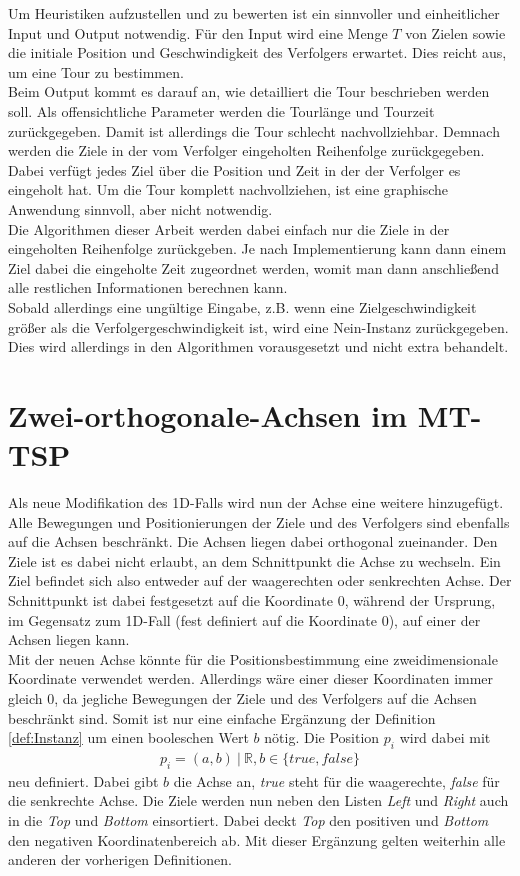 \documentclass[german,version-2019-11]{uzl-thesis}
\begin{document}
Um Heuristiken aufzustellen und zu bewerten ist ein sinnvoller und einheitlicher Input und Output notwendig. Für den Input wird eine Menge $T$ von Zielen sowie die initiale Position und Geschwindigkeit des Verfolgers erwartet. Dies reicht aus, um eine Tour zu bestimmen. \\
Beim Output kommt es darauf an, wie detailliert die Tour beschrieben werden soll. Als offensichtliche Parameter werden die Tourlänge und Tourzeit zurückgegeben. Damit ist allerdings die Tour schlecht nachvollziehbar. Demnach werden die Ziele in der vom Verfolger eingeholten Reihenfolge zurückgegeben. Dabei verfügt jedes Ziel über die Position und Zeit in der der Verfolger es eingeholt hat. Um die Tour komplett nachvollziehen, ist eine graphische Anwendung sinnvoll, aber nicht notwendig. \\
Die Algorithmen dieser Arbeit werden dabei einfach nur die Ziele in der eingeholten Reihenfolge zurückgeben. Je nach Implementierung kann dann einem Ziel dabei die eingeholte Zeit zugeordnet werden, womit man dann anschließend alle restlichen Informationen berechnen kann. \\
Sobald allerdings eine ungültige Eingabe, z.B. wenn eine Zielgeschwindigkeit größer als die Verfolgergeschwindigkeit ist, wird eine \glqq Nein\grqq-Instanz zurückgegeben. Dies wird allerdings in den Algorithmen vorausgesetzt und nicht extra behandelt. 

\chapter{Zwei-orthogonale-Achsen im MT-TSP}

Als neue Modifikation des 1D-Falls wird nun der Achse eine weitere hinzugefügt. Alle Bewegungen und Positionierungen der Ziele und des Verfolgers sind ebenfalls auf die Achsen beschränkt. Die Achsen liegen dabei orthogonal zueinander. Den Ziele ist es dabei nicht erlaubt, an dem Schnittpunkt die Achse zu wechseln. Ein Ziel befindet sich also entweder auf der waagerechten oder senkrechten Achse. Der Schnittpunkt ist dabei festgesetzt auf die Koordinate $0$, während der Ursprung, im Gegensatz zum 1D-Fall (fest definiert auf die Koordinate $0$), auf einer der Achsen liegen kann.\\
Mit der neuen Achse könnte für die Positionsbestimmung eine zweidimensionale Koordinate verwendet werden. Allerdings wäre einer dieser Koordinaten immer gleich $0$, da jegliche Bewegungen der Ziele und des Verfolgers auf die Achsen beschränkt sind. Somit ist nur eine einfache Ergänzung der Definition \ref{def:Instanz} um einen booleschen Wert $b$ nötig. Die Position $p_i$ wird dabei mit 
\begin{align*}
p_i = (a, b) ~|~\mathbb{R}, b\in \{true, false\}
\end{align*}
neu definiert. Dabei gibt $b$ die Achse an, \emph{true} steht für die waagerechte, \emph{false} für die senkrechte Achse. Die Ziele werden nun neben den Listen \emph{Left} und \emph{Right} auch in die \emph{Top} und \emph{Bottom} einsortiert. Dabei deckt \emph{Top} den positiven und \emph{Bottom} den negativen Koordinatenbereich ab. Mit dieser Ergänzung gelten weiterhin alle anderen der vorherigen Definitionen.
\end{document}

